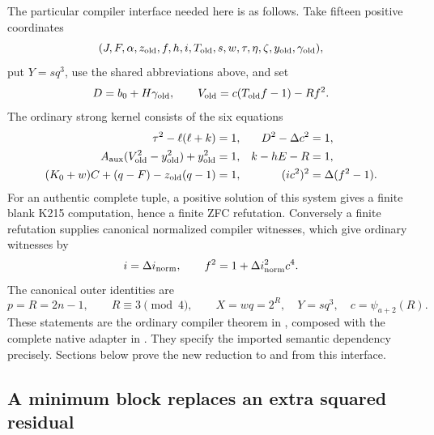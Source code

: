 The particular compiler interface needed here is as follows.  Take fifteen
positive coordinates
\[
 (J,F,\alpha,z_{\rm old},f,h,i,T_{\rm old},s,w,
       \tau,\eta,\zeta,y_{\rm old},\gamma_{\rm old}),
\]
put $Y=sq^3$, use the shared abbreviations above, and set
\[
 D=b_0+H\gamma_{\rm old},\qquad
 V_{\rm old}=c(T_{\rm old}f-1)-Rf^2.
\]
The ordinary strong kernel consists of the six equations
\begin{equation}\label{eq:sc-source}
\begin{aligned}
 \tau^2-\ell(\ell+k)&=1, & D^2-\Delta c^2&=1,\\
 A_{\rm aux}(V_{\rm old}^2-y_{\rm old}^2)+y_{\rm old}^2&=1,
       & k-hE-R&=1,\\
 (K_0+w)C+(q-F)-z_{\rm old}(q-1)&=1,
       & (ic^2)^2&=\Delta(f^2-1).
\end{aligned}
\end{equation}
For an authentic complete tuple, a positive solution of this system gives
a finite blank K215 computation, hence a finite ZFC refutation.  Conversely
a finite refutation supplies canonical normalized compiler witnesses, which
give ordinary witnesses by
\begin{equation}\label{eq:sc-normalized}
 i=\Delta i_{\rm norm},\qquad
 f^2=1+\Delta i_{\rm norm}^2c^4.
\end{equation}
The canonical outer identities are
\begin{equation}\label{eq:sc-canonical}
 p=R=2n-1,\qquad R\equiv3\pmod4,\qquad
 X=wq=2^R,\quad Y=sq^3,\quad c=\psi_{a+2}(R).
\end{equation}
These statements are the ordinary compiler theorem in
, composed with the complete native
adapter in .  They specify the imported semantic
dependency precisely.  Sections below prove the new reduction to and from
this interface.

\subsection{A minimum block replaces an extra squared residual}

